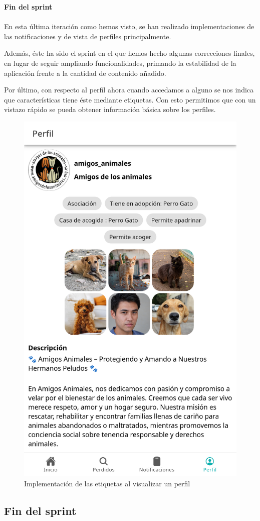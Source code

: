 \Large{\textbf{Fin del sprint}} \\ \\
En esta última iteración como hemos visto, se han realizado implementaciones de las notificaciones y de vista de perfiles principalmente. 

Además, éste ha sido el sprint en el que hemos hecho algunas correcciones finales, en lugar de seguir ampliando funcionalidades, primando la estabilidad de la aplicación frente a la cantidad de contenido añadido.

Por último, con respecto al perfil ahora cuando accedamos a alguno se nos indica que características tiene éste mediante etiquetas. Con esto permitimos que con un vistazo rápido se pueda obtener información básica sobre los perfiles.

\begin{figure}[H]
	\centering
	\includegraphics[width=0.5\linewidth]{"sprint 4/etiquetasPerfil"}
	\caption{Implementación de las etiquetas al  visualizar un perfil}
	\label{fig:etiquetasperfil}
\end{figure}

\subsection{Fin del sprint}

